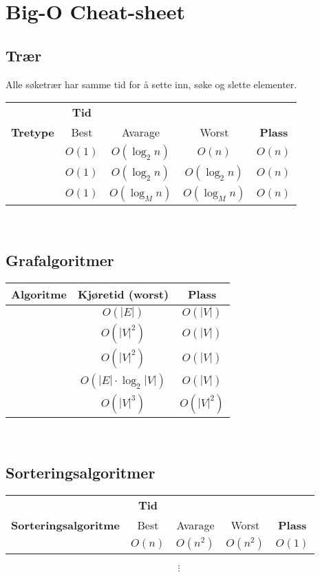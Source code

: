 \section{\color{red} Big-O Cheat-sheet}
\subsection*{Trær}
Alle søketrær har samme tid for å sette inn, søke og slette elementer.
\begin{center}
\begin{tabular}{c || c  c  c | c}
	                   & \textbf{Tid} &                 &                 &  \\
	 \textbf{Tretype}  & {Best}       & {Avarage}       & {Worst}         & \textbf{Plass} \\ \hline
	\nameref{bintraer} & $ O(1) $     & $ O(\log_2 n) $ & $ O(n) $        & $ O(n) $       \\
	 \nameref{rb_tre}  & $ O(1) $     & $ O(\log_2 n) $ & $ O(\log_2 n) $ & $ O(n) $       \\
	 \nameref{b-tre}   & $ O(1) $     & $ O(\log_M n) $ & $ O(\log_M n) $ & $ O(n) $
\end{tabular}
\end{center}

~\\\subsection*{Grafalgoritmer}
\begin{center}
\begin{tabular}{c || c | c}
	\textbf{Algoritme} & \textbf{Kjøretid (worst)}   & \textbf{Plass} \\ \hline
	  \nameref{dfs}    & $ O(|E|) $                  & $ O(|V|) $     \\
	\nameref{dijkstra} & $ O(|V|^2) $                & $ O(|V|) $     \\
	  \nameref{prim}   & $ O(|V|^2) $                & $ O(|V|) $     \\
	\nameref{kruskal}  & $ O(|E| \cdot \log_2 |V|) $ & $ O(|V|) $     \\
	 \nameref{floyd}   & $ O(|V|^3) $                & $ O(|V|^2) $
\end{tabular}
\end{center}


~\\\subsection*{Sorteringsalgoritmer}
\begin{center}
\begin{tabular}{c || c  c  c | c}
	                             & \textbf{Tid} &            &            &  \\
	\textbf{Sorteringsalgoritme} & {Best}       & {Avarage}  & {Worst}    & \textbf{Plass} \\ \hline
	    \nameref{bubblesort}     & $ O(n) $     & $ O(n^2) $ & $ O(n^2) $ & $ O(1) $
\end{tabular}
\[ \vdots \]
\end{center}